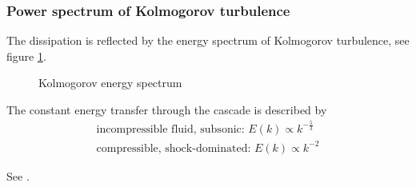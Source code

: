 \subsubsection{Power spectrum of Kolmogorov turbulence}
The dissipation is reflected by the energy spectrum of Kolmogorov turbulence, see figure \ref{fig:kolmogorov_spectrum}.

\begin{figure}[!htb]
    \centering
    
    \caption{Kolmogorov energy spectrum}
    \label{fig:kolmogorov_spectrum}
\end{figure}

The constant energy transfer through the cascade is described by
\begin{equation}
    \begin{gathered}
        \text{incompressible fluid, subsonic: } E(k) \propto k^{-\frac{5}{3}} \\
        \text{compressible, shock-dominated: } E(k) \propto k^{-2}
    \end{gathered}
\end{equation}


See \cite{springel23}.

\pagebreak